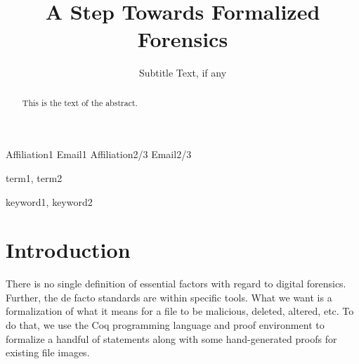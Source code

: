 \documentclass{sigplanconf}
\begin{document}
\setlength{\pdfpageheight}{\paperheight}
\setlength{\pdfpagewidth}{\paperwidth}






\title{A Step Towards Formalized Forensics}
\subtitle{Subtitle Text, if any}

           {Affiliation1}
           {Email1}
           {Affiliation2/3}
           {Email2/3}

\maketitle

\begin{abstract}
This is the text of the abstract.
\end{abstract}


\terms
term1, term2

\keywords
keyword1, keyword2

\section{Introduction}

There is no single definition of essential factors with regard to digital
forensics. Further, the de facto standards are within specific tools. What we
want is a formalization of what it means for a file to be malicious, deleted,
altered, etc. To do that, we use the Coq programming language and proof
environment to formalize a handful of statements along with some
hand-generated proofs for existing file images.
\end{document}
